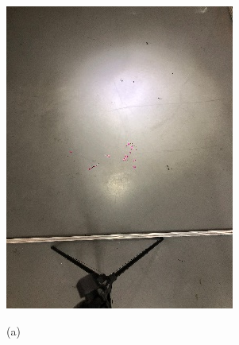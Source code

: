  \begin{figure}[!htbp]
    \centering
              \begin{minipage}{0.3\linewidth}
                \centering
                \centerline{\includegraphics[width=\textwidth]{FIG/fig9(a).png}}
                \centerline{(a)}
              \end{minipage}
              \begin{minipage}{0.3\linewidth}
                \centering

\end{minipage}
\end{figure}
